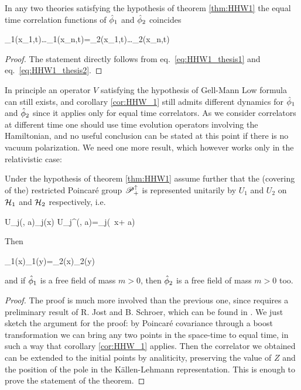 \documentclass[../main/main.tex]{subfiles}
\begin{document}
\begin{corollary}\label{cor:HHW_1}
	In any two theories satisfying the hypothesis of theorem \ref{thm:HHW1} the equal time correlation functions of $\hat{\phi}_1$ and $\hat{\phi}_2$ coincides
	\begin{eq}
		\ophi_1(\vec x_1,t)\ldots\ophi_1(\vec x_n,t)=\ophi_2(\vec x_1,t)\ldots\ophi_2(\vec x_n,t)
	\end{eq}
\end{corollary} 
\begin{proof}
	The statement directly follows from eq.~\eqref{eq:HHW1_thesis1} and eq.~\eqref{eq:HHW1_thesis2}.
\end{proof}

In principle an operator $V$ satisfying the hypothesis of Gell-Mann Low formula can still exists, and corollary \ref{cor:HHW_1} still admits different dynamics for $\hat{\phi}_1$ and $\hat{\phi}_2$ since it applies only for equal time correlators. As we consider correlators at different time one should use time evolution operators involving the Hamiltonian, and no useful conclusion can be stated at this point if there is no vacuum polarization. We need one more result, which however works only in the relativistic case:

\begin{theorem}\label{thm:HHW2}
	Under the hypothesis of theorem \ref{thm:HHW1} assume further that the (covering of the) restricted Poincaré group $\mathscr P_+^\uparrow$ is represented unitarily by $U_1$ and $U_2$ on $\mathcal H_1$ and $\mathcal H_2$ respectively, i.e.
	\begin{eq}
		U_j(\Lambda, a)\ophi_j(x) U_j^\dagger(\Lambda, a)=\ophi_j(\Lambda\, x+ a)
	\end{eq}
	Then
	\begin{eq}
		\ophi_1(x)\ophi_1(y)=\ophi_2(x)\ophi_2(y)\ket{0_2}
	\end{eq}
	and if $\hat{\phi}_1$ is a free field of mass $m>0$, then $\hat{\phi}_2$ is a free field of mass $m>0$ too.
\end{theorem}
\begin{proof}
	The proof is much more involved than the previous one, since requires a preliminary result of R. Jost and B. Schroer, which can be found in \cite[Thm. 4.15]{Streater:2000}. We just sketch the argument for the proof: by Poincaré covariance through a boost transformation we can bring any two points in the space-time to equal time, in such a way that corollary \ref{cor:HHW_1} applies. Then the correlator we obtained can be extended to the initial points by analiticity, preserving the value of $Z$ and the position of the pole in the Källen-Lehmann representation. This is enough to prove the statement of the theorem.  
\end{proof}
\end{document}
